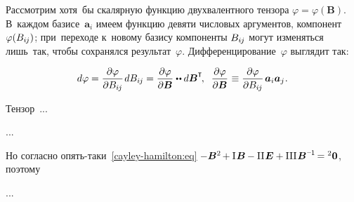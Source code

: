 \begin{otherlanguage}{russian}

Рассмотрим хотя~бы скалярную функцию двухвалентного тензора ${\varphi \!=\! \varphi(\bm{B})}$. В~каждом базисе~${\bm{a}_i}$ имеем функцию девяти числовых аргументов, компонент~${\varphi(B_{i\hspace{-0.1ex}j})}$; при~переходе к~новому базису компоненты ${B_{i\hspace{-0.1ex}j}}$ могут изменяться лишь~так, чтобы сохранялся результат~$\varphi$. Дифференцирование~$\varphi$ выглядит так:

\nopagebreak\vspace{-0.1em}\begin{equation}
d \varphi = \displaystyle \frac{\partial \varphi}{\partial B_{i\hspace{-0.1ex}j}} \hspace{0.2ex} d B_{i\hspace{-0.1ex}j} = \displaystyle \frac{\partial \varphi}{\partial \bm{B}} \dotdotp d \bm{B}^{\T} \hspace{-0.25ex} , \;\;
\displaystyle \frac{\partial \varphi}{\partial \bm{B}} \hspace{0.1ex} \equiv \displaystyle \frac{\partial \varphi}{\partial B_{i\hspace{-0.1ex}j}} \hspace{0.25ex} \bm{a}_i \bm{a}_j \hspace{0.1ex}.
\end{equation}

Тензор~...

...

Но согласно опять\hbox{-}таки~\eqref{cayley-hamilton:eq}
${\hspace{-0.1ex} -\bm{B}^{2} \hspace{-0.2ex} + \mathrm{I}\hspace{0.16ex} \bm{B} \hspace{-0.1ex} - \mathrm{II}\hspace{0.16ex} \bm{E} + \mathrm{III}\hspace{0.16ex} \bm{B}^{\expminusone} \hspace{-0.25ex} = {^2\bm{0}}}$, поэтому

...




\end{otherlanguage}
